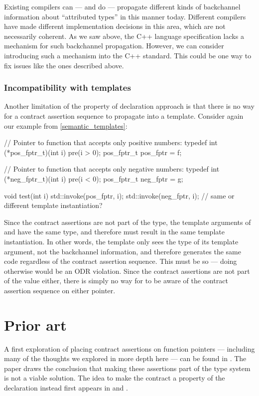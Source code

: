 Existing compilers can --- and do --- propagate different kinds of backchannel information about ``attributed types'' in this manner today. Different compilers have made different implementation decisions in this area, which are not necessarily coherent. As we saw above, the C++ language specification lacks a mechanism for such backchannel propagation. However, we can consider introducing such a mechanism into the C++ standard. This could be one way to fix issues like the ones described above.

\subsubsection{Incompatibility with templates}

Another limitation of the property of declaration approach is that there is no way for a contract assertion sequence to propagate into a template. Consider again our example from \ref{semantic_templates}:
\begin{codeblock}
// Pointer to function that accepts only positive numbers:
typedef int (*pos_fptr_t)(int i) pre(i > 0);
pos_fptr_t pos_fptr = f;

// Pointer to function that accepts only negative numbers:
typedef int (*neg_fptr_t)(int i) pre(i < 0);
pos_fptr_t neg_fptr = g;

void test(int i) {
  std::invoke(pos_fptr, i);
  std::invoke(neg_fptr, i);  // same or different template instantiation?
}
\end{codeblock}
Since the contract assertions are not part of the type, the template arguments of  and  have the same type, and therefore must result in the same template instantiation. In other words, the template only sees the type of its template argument, not the backchannel information, and therefore generates the same code regardless of the contract assertion sequence. This must be so --- doing otherwise would be an ODR violation. Since the contract assertions are not part of the value either, there is simply no way for  to be aware of the contract assertion sequence on either pointer.


\section{Prior art}
\label{priorart}

A first exploration of placing contract assertions on function pointers --- including many of the thoughts we explored in more depth here --- can be found in \cite{N4110}. The paper draws the conclusion that making these assertions part of the type system is not a viable solution. The idea to make the contract a property of the declaration instead first appears in  \cite{P0246R0} and \cite{P0247R0}.


